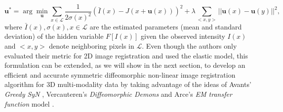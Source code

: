 \begin{equation}\label{eq:elastic}
    \mathbf{u}^{*} = \arg \min_{\mathbf{u}} \sum_{x \in \mathcal{L}} \frac{1}{2 \sigma(x)^{2}} ( \bar{I}(x) - J(x + \mathbf{u}(x)))^{2} + \lambda \sum_{<x, y>} ||\mathbf{u}(x) - \mathbf{u}(y)||^{2},
\end{equation}
where $\bar{I}(x), \sigma(x), x\in \mathcal{L}$ are the estimated parameters (mean and standard deviation) of the hidden variable $F[I(x)]$ given the
observed intensity $I(x)$ and $<x, y>$ denote neighboring pixels in $\mathcal{L}$. Even though the authors only evaluated their metric for 2D image registration and used
the elastic model, this formulation can be extended, as we will show in the next section, to develop an efficient and accurate symmetric diffeomorphic non-linear image registration algorithm for 3D multi-modality data by taking advantage of the ideas of Avants' \textit{Greedy SyN} \cite{Avants2008}, Vercauteren's \textit{Diffeomorphic Demons} \cite{Vercauteren2009}and Arce's \textit{EM transfer function} model \cite{Arce-santana2014}.\\

